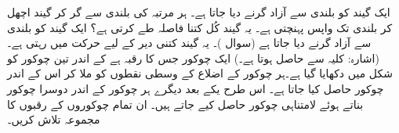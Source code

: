 ایک گیند کو  بلندی سے آزاد گرنے دیا  جاتا ہے۔ ہر  مرتبہ   کی بلندی سے گر کر  گیند اچھل کر  بلندی  تک واپس پہنچتی ہے۔ یہ گیند کُل کتنا فاصلہ طے کرتی ہے؟
ایک گیند کو  بلندی سے  آزاد گرنے دیا جاتا ہے (سوال )۔ یہ گیند کتنی دیر کے لیے حرکت میں رہتی ہے۔ (اشارہ: کلیہ  سے  حاصل ہوتا ہے۔)
ایک چوکور جس کا رقبہ  ہے کے اندر تین چوکور کو  شکل  میں دکھایا گیا ہے۔ہر چوکور کے اضلاع کے وسطی نقطوں کو ملا کر اس کے اندر  چوکور حاصل کیا جاتا ہے۔ اس طرح یکے بعد دیگرے ہر چوکور کے اندر دوسرا چوکور بناتے ہوئے لامتناہی چوکور حاصل کیے جاتے ہیں۔ ان تمام چوکوروں کے رقبوں کا مجموعہ تلاش کریں۔
